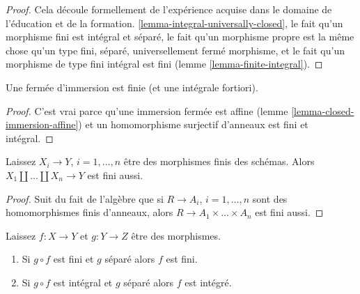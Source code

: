 \begin{proof}

Cela découle formellement de l'expérience acquise dans le domaine de l'éducation et de la formation. \ref{lemma-integral-universally-closed}, le fait qu'un morphisme fini est intégral et séparé, le fait qu'un morphisme propre est la même chose qu'un type fini, séparé, universellement fermé morphisme, et le fait qu'un morphisme de type fini intégral est fini (lemme \ref{lemma-finite-integral}).

\end{proof}

\begin{lemma}

\label{lemma-closed-immersion-finite}

Une fermée d'immersion est finie (et une intégrale fortiori).

\end{lemma}

\begin{proof}

C'est vrai parce qu'une immersion fermée est affine (lemme \ref{lemma-closed-immersion-affine}) et un homomorphisme surjectif d'anneaux est fini et intégral.

\end{proof}

\begin{lemma}

\label{lemma-finite-union-finite}
Laissez $X_i \to Y$, $i = 1, \ldots, n$ être des morphismes finis des schémas. Alors $X_1 \amalg \ldots \amalg X_n \to Y$ est fini aussi.
\end{lemma}

\begin{proof}
Suit du fait de l'algèbre que si $R \to A_i$, $i = 1, \ldots, n$ sont des homomorphismes finis d'anneaux, alors $R \to A_1 \times \ldots \times A_n$ est fini aussi.
\end{proof}

\begin{lemma}

\label{lemma-finite-permanence}
Laissez $f : X \to Y$ et $g : Y \to Z$ être des morphismes.
\begin{enumerate}
\item Si $g \circ f$ est fini et $g$ séparé alors $f$ est fini.
\item Si $g \circ f$ est intégral et $g$ séparé alors $f$ est intégré.
\end{enumerate}

\end{lemma}

